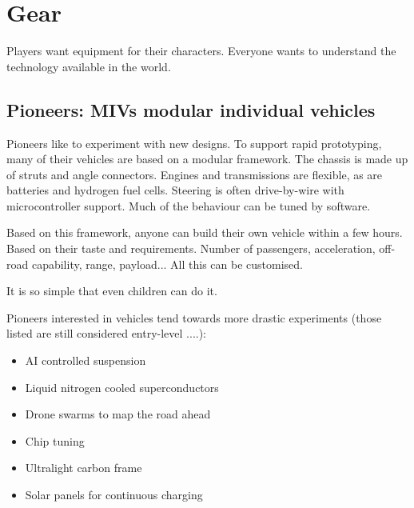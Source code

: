 \chapter{Gear}

Players want equipment for their characters. Everyone wants to understand the technology available in the world.




\section{Pioneers: MIVs modular individual vehicles}
\label{sec:MIV}

Pioneers like to experiment with new designs. To support rapid prototyping, many of their vehicles are based on a modular framework. The chassis is made up of struts and angle connectors. Engines and transmissions are flexible, as are batteries and hydrogen fuel cells. Steering is often drive-by-wire with microcontroller support. Much of the behaviour can be tuned by software.

Based on this framework, anyone can build their own vehicle within a few hours. Based on their taste and requirements. Number of passengers, acceleration, off-road capability, range, payload... All this can be customised.

It is so simple that even children can do it.

Pioneers interested in vehicles tend towards more drastic experiments (those listed are still considered entry-level ....):

\begin{itemize}
    \item AI controlled suspension
    \item Liquid nitrogen cooled superconductors
    \item Drone swarms to map the road ahead
    \item Chip tuning
    \item Ultralight carbon frame
    \item Solar panels for continuous charging
\end{itemize}


